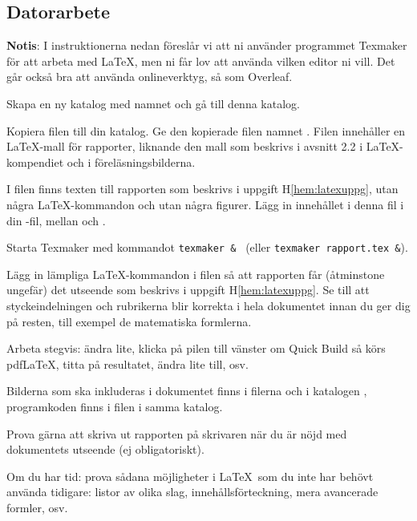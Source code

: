 \newpage

\subsection*{Datorarbete}

\textbf{Notis}: I instruktionerna nedan föreslår vi att ni använder programmet Texmaker för att arbeta med \LaTeX, men ni får lov att använda vilken editor ni vill. Det går också bra att använda onlineverktyg, så som Overleaf.

\begin{Datorarbete}
	\item Skapa en ny katalog med namnet  och gå till denna katalog.
	\item Kopiera filen  till din katalog. Ge den kopierade filen namnet . Filen innehåller en \LaTeX-mall för rapporter, liknande den mall som beskrivs i avsnitt 2.2 i \LaTeX-kompendiet och i föreläsningsbilderna.

	\item I filen  finns texten till rapporten som beskrivs i uppgift H\ref{hem:latexuppg}, utan några \LaTeX-kommandon och utan några figurer. Lägg in innehållet i denna fil i din -fil, mellan \verb!! och \verb!!.

	\item Starta Texmaker med kommandot \verb/texmaker & / (eller \verb/texmaker rapport.tex &/).

	\item Lägg in lämpliga \LaTeX-kommandon i filen så att rapporten får (åtminstone ungefär) det utseende som beskrivs i uppgift H\ref{hem:latexuppg}. Se till att styckeindelningen och rubrikerna blir korrekta i hela dokumentet innan du ger dig på resten, till exempel de matematiska formlerna.

	Arbeta stegvis: ändra lite, klicka på pilen till vänster om Quick Build så körs pdfLaTeX, titta på resultatet, ändra lite till, osv.

	Bilderna som ska inkluderas i dokumentet finns i filerna  och  i katalogen , programkoden finns i filen  i samma katalog.

	\item Prova gärna att skriva ut rapporten på skrivaren när du är nöjd med dokumentets utseende (ej obligatoriskt).

	\item Om du har tid: prova sådana möjligheter i \LaTeX\ som du inte har behövt använda tidigare: listor av olika slag, innehållsförteckning, mera avancerade formler, osv.
\end{Datorarbete}

